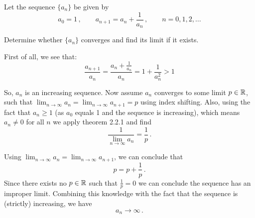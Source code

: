 \documentclass[week=3]{homework}
\begin{document}
\begin{questions}
    
	    \question Let the sequence $\{a_n\}$ be given by
	    \[
		    a_0 = 1\,, \qquad a_{n+1} = a_n + \frac{1}{a_n}\,, \qquad n = 0,1,2,\ldots
	    \]
	    
	    Determine whether $\{a_n\}$ converges and find its limit if it exists.
	    
	    First of all, we see that:
	    \[
		    \frac{a_{n+1}}{a_n} = \frac{a_n + \frac{1}{a_n}}{a_n} = 1 + \frac{1}{a_n^2} > 1
	    \]
	    
	    So, $a_n$ is an increasing sequence. 
	    Now assume $a_n$ converges to some limit $p \in \mathbb{R}$, such that $\lim_{n\to\infty}a_{n} = \lim_{n\to\infty}a_{n+1} = p$ using index shifting. Also, using the fact that $a_n \geq 1$ (as $a_0$ equals 1 and the sequence is increasing), which means $a_n \neq 0$ for all $n$ we apply theorem 2.2.1 and find
	    \[
		    \frac{1}{\lim_{n\to\infty}a_n} = \frac{1}{p}\,.
	    \]
	    
	    Using $\lim_{n \to \infty} a_n = \lim_{n \to \infty} a_{n+1}$, we can conclude that
	    \[
		    p = p + \frac{1}{p}\,.
	    \]
	    Since there exists no $p \in \mathbb{R}$ such that $\frac{1}{p} = 0$ we can conclude the sequence has an improper limit. Combining this knowledge with the fact that the sequence is (strictly) increasing, we have
	    \[
		    a_n \to \infty\,.
	    \]
     \end{questions}
\end{document}
